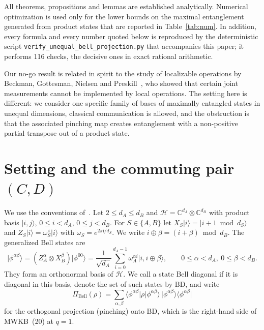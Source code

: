 \documentclass[11pt,a4paper]{article}
\theoremstyle{definition}
\theoremstyle{remark}
\newcommand{\ket}[1]{\lvert #1\rangle}
\newcommand{\bra}[1]{\langle #1\rvert}
\newcommand{\ketbra}[2]{\lvert #1\rangle\langle #2\rvert}
\newcommand{\dA}{d_A}
\newcommand{\dB}{d_B}
\newcommand{\wA}{\omega_A}
\newcommand{\PiB}{\Pi_{\mathrm{Bell}}}
\newcommand{\BD}{\mathrm{BD}}
\newcommand{\phib}[2]{\phi^{#1#2}}
\begin{document}
All theorems, propositions and lemmas are established analytically. Numerical optimization
is used only for the lower bounds on the maximal entanglement generated from product
states that are reported in Table~\ref{tab:num}. In addition, every formula and every
number quoted below is reproduced by the deterministic script
\texttt{verify\_unequal\_bell\_projection.py} that accompanies this paper; it performs 116
checks, the decisive ones in exact rational arithmetic.

Our no-go result is related in spirit to the study of localizable operations by Beckman,
Gottesman, Nielsen and Preskill~\cite{BGNP01}, who showed that certain joint measurements
cannot be implemented by local operations. The setting here is different: we consider one
specific family of bases of maximally entangled states in unequal dimensions, classical
communication is allowed, and the obstruction is that the associated pinching map creates
entanglement with a non-positive partial transpose out of a product state.

\section{Setting and the commuting pair \texorpdfstring{$(C,D)$}{(C,D)}}

We use the conventions of~\cite{MWKB24}. Let $2\le\dA\le\dB$ and
$\mathcal{H}=\mathbb{C}^{\dA}\otimes\mathbb{C}^{\dB}$ with product basis $\ket{i,j}$,
$0\le i<\dA$, $0\le j<\dB$. For $S\in\{A,B\}$ let $X_S\ket{i}=\ket{i+1 \bmod d_S}$ and
$Z_S\ket{i}=\omega_S^{\,i}\ket{i}$ with $\omega_S=e^{2\pi \mathrm{i}/d_S}$. We write
$i\oplus\beta=(i+\beta)\bmod\dB$. The generalized Bell states are
\begin{equation}\label{eq:bell}
\ket{\phib\alpha\beta}=(Z_A^{\alpha}\otimes X_B^{\beta})\ket{\phib00}
=\frac{1}{\sqrt{\dA}}\sum_{i=0}^{\dA-1}\wA^{\alpha i}\ket{i,i\oplus\beta},
\qquad 0\le\alpha<\dA,\ 0\le\beta<\dB .
\end{equation}
They form an orthonormal basis of $\mathcal{H}$. We call a state Bell diagonal if it is
diagonal in this basis, denote the set of such states by $\BD$, and write
\begin{equation}\label{eq:Pi}
\PiB(\rho)=\sum_{\alpha,\beta}\bra{\phib\alpha\beta}\rho\ket{\phib\alpha\beta}\,
\ketbra{\phib\alpha\beta}{\phib\alpha\beta}
\end{equation}
for the orthogonal projection (pinching) onto $\BD$, which is the right-hand side of
MWKB~(20) at $q=1$.
\end{document}
